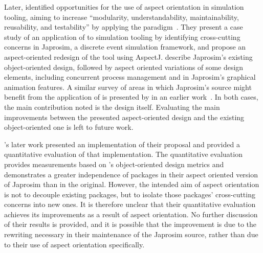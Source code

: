 Later, \citet{chibani2019using} identified opportunities for the use of aspect
orientation in simulation tooling, aiming to increase ``modularity,
understandability, maintainability, reusability, and testability'' by applying
the paradigm~\cite{chibani2019using}. They present a case study of an
application of \aspectorientation{} to simulation tooling by identifying
cross-cutting concerns in Japrosim, a discrete event simulation framework, and
propose an aspect-oriented redesign of the tool using AspectJ.
\citeauthor{chibani2019using} describe Japrosim's existing object-oriented
design, followed by aspect oriented variations of some design elements,
including concurrent process management and in Japrosim's graphical animation
features. A similar survey of areas in which Japrosim's source might benefit
from the application of \aspectorientation{} is presented by
\citeauthor{chibani2014practical} in an earlier
work~\cite{chibani2014practical}. In both cases, the main contribution noted is
the design itself. Evaluating the main improvements between the presented
aspect-oriented design and the existing object-oriented one is left to future
work.

\citet{chibani2019using}'s later work presented an implementation of their
proposal and provided a quantitative evaluation of that implementation. The
quantitative evaluation provides measurements based on \citet{martin1994oo}'s
object-oriented design metrics and demonstrates a greater independence of
packages in their aspect oriented version of Japrosim than in the original.
However, the intended aim of aspect orientation is not to decouple existing
packages, but to isolate those packages' cross-cutting concerns into new ones.
It is therefore unclear that their quantitative evaluation achieves its
improvements as a result of aspect orientation. No further discussion of their
results is provided, and it is possible that the improvement is due to the
rewriting necessary in their maintenance of the Japrosim source, rather than due
to their use of aspect orientation specifically.

